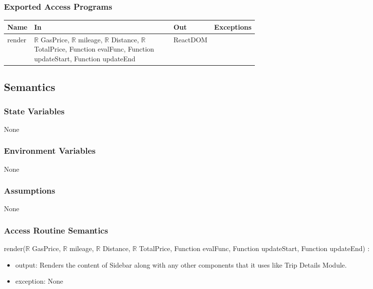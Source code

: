 \documentclass[12pt, titlepage]{article}
\begin{document}
\subsubsection{Exported Access Programs}

\begin{tabular}{| l | p{0.6\linewidth}| l | l |}
  \hline
  \textbf{Name} & \textbf{In} & \textbf{Out} & \textbf{Exceptions}\\
  \hline
  render & $\mathbb{R}$ GasPrice, $\mathbb{R}$ mileage, $\mathbb{R}$ Distance, $\mathbb{R}$ TotalPrice, Function evalFunc, Function updateStart, Function updateEnd & ReactDOM & ~\\
  \hline
\end{tabular}

\subsection{Semantics}

\subsubsection{State Variables}

None

\subsubsection{Environment Variables}

None

\subsubsection{Assumptions}

None

\subsubsection{Access Routine Semantics}

\noindent render($\mathbb{R}$ GasPrice, $\mathbb{R}$ mileage, $\mathbb{R}$ Distance, $\mathbb{R}$ TotalPrice, Function evalFunc, Function updateStart, Function updateEnd) :
\begin{itemize}
\item output: Renders the content of Sidebar along with any other components that it uses like Trip Details Module.
\item exception: None
\end{itemize}
\end{document}
